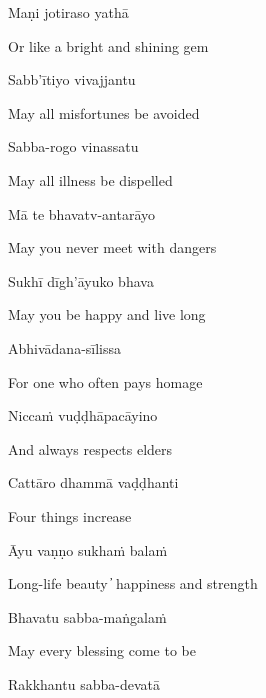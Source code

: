 Maṇi jotiraso yathā

\begin{cprenglish}
  Or like a bright and shining gem\\
\end{cprenglish}

Sabb'ītiyo vivajjantu

\begin{cprenglish}
  May all misfortunes be avoided
\end{cprenglish}

Sabba-rogo vinassatu

\begin{cprenglish}
  May all illness be dispelled
\end{cprenglish}

Mā te bhavatv-antarāyo

\begin{cprenglish}
  May you never meet with dangers
\end{cprenglish}

Sukhī dīgh'āyuko bhava

\begin{cprenglish}
  May you be happy and live long
\end{cprenglish}

Abhivādana-sīlissa

\begin{cprenglish}
  For one who often pays homage
\end{cprenglish}

Niccaṁ vuḍḍhāpacāyino

\begin{cprenglish}
  And always respects elders
\end{cprenglish}

Cattāro dhammā vaḍḍhanti

\begin{cprenglish}
  Four things increase
\end{cprenglish}

Āyu vaṇṇo sukhaṁ balaṁ

\begin{cprenglish}
  Long-life beauty  ̓  happiness and strength
\end{cprenglish}

Bhavatu sabba-maṅgalaṁ

\begin{cprenglish}
  May every blessing come to be
\end{cprenglish}

Rakkhantu sabba-devatā


